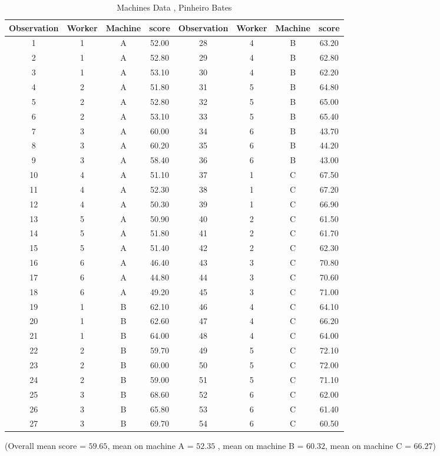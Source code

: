 \documentclass[12pt, a4paper]{report}
\theoremstyle{plain}
\theoremstyle{definition}
\theoremstyle{remark}
\begin{document}
\begin{table}[h!]
	\begin{center}
		\begin{tabular}{|c|c|c|c||c|c|c|c|}
			\hline
			Observation & Worker & Machine & score & Observation & Worker & Machine & score \\
			\hline
			1 & 1 & A & 52.00 &	28 & 4 & B & 63.20 \\
			2 & 1 & A & 52.80 &	  29 & 4 & B & 62.80 \\
			3 & 1 & A & 53.10 &	  30 & 4 & B & 62.20 \\
			4 & 2 & A & 51.80 &	  31 & 5 & B & 64.80 \\
			5 & 2 & A & 52.80 &	  32 & 5 & B & 65.00 \\
			6 & 2 & A & 53.10 &	  33 & 5 & B & 65.40 \\
			7 & 3 & A & 60.00 &	  34 & 6 & B & 43.70 \\
			8 & 3 & A & 60.20 &	  35 & 6 & B & 44.20 \\
			9 & 3 & A & 58.40 &	  36 & 6 & B & 43.00 \\
			10 & 4 & A & 51.10 &	  37 & 1 & C & 67.50 \\
			11 & 4 & A & 52.30 &	  38 & 1 & C & 67.20 \\
			12 & 4 & A & 50.30 &	  39 & 1 & C & 66.90 \\
			13 & 5 & A & 50.90 &	  40 & 2 & C & 61.50 \\
			14 & 5 & A & 51.80 &	  41 & 2 & C & 61.70 \\
			15 & 5 & A & 51.40 &	  42 & 2 & C & 62.30 \\
			16 & 6 & A & 46.40 &	  43 & 3 & C & 70.80 \\
			17 & 6 & A & 44.80 &	  44 & 3 & C & 70.60 \\
			18 & 6 & A & 49.20 &	  45 & 3 & C & 71.00 \\
			19 & 1 & B & 62.10 &	  46 & 4 & C & 64.10 \\
			20 & 1 & B & 62.60 &	  47 & 4 & C & 66.20 \\
			21 & 1 & B & 64.00 &	  48 & 4 & C & 64.00 \\
			22 & 2 & B & 59.70 &	  49 & 5 & C & 72.10 \\
			23 & 2 & B & 60.00 &	  50 & 5 & C & 72.00 \\
			24 & 2 & B & 59.00 &	  51 & 5 & C & 71.10 \\
			25 & 3 & B & 68.60 &	  52 & 6 & C & 62.00 \\
			26 & 3 & B & 65.80 &	  53 & 6 & C & 61.40 \\
			27 & 3 & B & 69.70 &	  54 & 6 & C & 60.50 \\
			
			\hline
		\end{tabular}
		\caption{Machines Data , Pinheiro Bates}
	\end{center}
\end{table}
(Overall mean score = $59.65$, mean on machine A = $52.35$ , mean
on machine B = $60.32$, mean on machine C = $66.27$)
\end{document}
